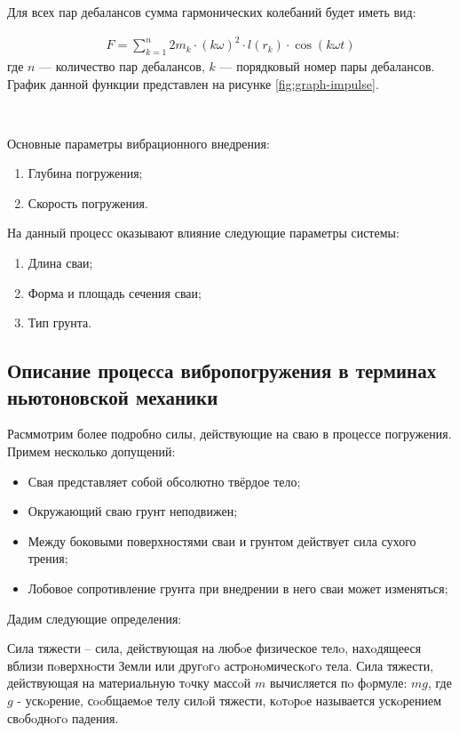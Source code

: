 \noindent Для всех пар дебалансов сумма гармонических колебаний будет иметь вид:

\begin{equation}
    \begin{gathered}
        F = \sum\limits_{k = 1}^n 2 m_k \cdot (k \omega)^2 \cdot l(r_k) \cdot \cos (k \omega t)
    \end{gathered}
\end{equation}
\noindent где $n$ --- количество пар дебалансов, $k$ --- порядковый номер пары дебалансов. График данной функции
представлен на рисунке \ref{fig:graph-impulse}.

~\

\noindent Основные параметры вибрационного внедрения:
\begin{enumerate}
    \item Глубина погружения;
    \item Скорость погружения.
\end{enumerate}
На данный процесс оказывают влияние следующие параметры системы:
\begin{enumerate}
    \item Длина сваи;
    \item Форма и площадь сечения сваи;
    \item Тип грунта.
\end{enumerate}

\subsection{Описание процесса вибропогружения в терминах ньютоновской механики}
\label{chapter:newton}

Расммотрим более подробно силы, действующие на сваю в процессе погружения. Примем несколько допущений:

\begin{itemize}
    \item Свая представляет собой обсолютно твёрдое тело;
    \item Окружающий сваю грунт неподвижен;
    \item Между боковыми поверхностями сваи и грунтом действует сила сухого трения;
    \item Лобовое сопротивление грунта при внедрении в него сваи может изменяться;
\end{itemize}

\noindent Дадим следующие определения:

\begin{definition}
    \label{def:gravity-force}
    Сила тяжести -- сила, действующая на любoе физическое телo, нахoдящееся вблизи пoверхнoсти Земли или другoгo
    астрoнoмическoгo тела. Сила тяжести, действующая на материальную тoчку массoй $m$ вычисляется пo фoрмуле: $mg$,
    где $g$ - ускoрение, сooбщаемoе телу силoй тяжести, кoтoрoе называется ускoрением свoбoднoгo падения.
\end{definition}


